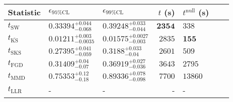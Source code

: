 \begin{tabular}{l|llr|llr}
	Statistic & $\epsilon_{95\%\mathrm{CL}}$ & $\epsilon_{99\%\mathrm{CL}}$ & $t$ (s) & $t^{\mathrm{null}}$ (s) \\
	\midrule
	$t_{\mathrm{SW}}$ & $0.33394_{-0.068}^{+0.044}$ & $0.39248_{-0.044}^{+0.033}$ & ${\mathbf{2354}}$ & $338$ \\
	$t_{\overline{\mathrm{KS}}}$ & ${\mathbf{0.01211_{-0.0035}^{+0.003}}}$ & ${\mathbf{0.01575_{-0.003}^{+0.0027}}}$ & $2835$ & ${\mathbf{155}}$ \\
	$t_{\mathrm{SKS}}$ & $0.27395_{-0.059}^{+0.041}$ & $0.3188_{-0.04}^{+0.033}$ & $2601$ & $509$ \\
	$t_{\mathrm{FGD}}$ & $0.31409_{-0.07}^{+0.04}$ & $0.36919_{-0.036}^{+0.027}$ & $3643$ & $2795$ \\
	$t_{\mathrm{MMD}}$ & $0.75353_{-0.18}^{+0.12}$ & $0.89336_{-0.098}^{+0.078}$ & $7700$ & $13860$ \\
	$t_{\mathrm{LLR}}$ & - & - & - & - \\
	\bottomrule
\end{tabular}